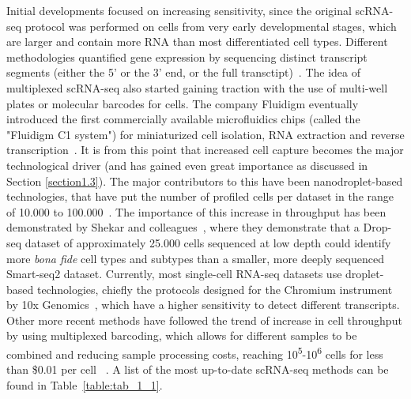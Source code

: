 Initial developments focused on increasing sensitivity, since the original scRNA-seq protocol was performed on cells from very early developmental stages, which are larger and contain more RNA than most differentiated cell types. Different methodologies quantified gene expression by sequencing distinct transcript segments (either the 5' or the 3' end, or the full transctipt)~\citep{islam_characterization_2011,hashimshony_cel-seq:_2012,ramskold_full-length_2012,picelli_full-length_2014}. The idea of multiplexed scRNA-seq also started gaining traction with the use of multi-well plates or molecular barcodes for cells. The company Fluidigm eventually introduced the first commercially available microfluidics chips (called the "Fluidigm C1 system") for miniaturized cell isolation, RNA extraction and reverse transcription~\citep{brennecke_accounting_2013}. It is from this point that increased cell capture becomes the major technological driver (and has gained even great importance as discussed in Section \ref{section1.3}). The major contributors to this have been nanodroplet-based technologies, that have put the number of profiled cells per dataset in the range of 10.000 to 100.000~\citep{macosko_highly_2015,klein_droplet_2015}. The importance of this increase in throughput has been demonstrated by Shekar and colleagues~\citep{shekhar_comprehensive_2016}, where they demonstrate that a Drop-seq dataset of approximately 25.000 cells sequenced at low depth could identify more \textit{bona fide} cell types and subtypes than a smaller, more deeply sequenced Smart-seq2 dataset. Currently, most single-cell RNA-seq datasets use droplet-based technologies, chiefly the protocols designed for the Chromium instrument by 10x Genomics~\citep{zheng_massively_2017}, which have a higher sensitivity to detect different transcripts. Other more recent methods have followed the trend of increase in cell throughput by using multiplexed barcoding, which allows for different samples to be combined and reducing sample processing costs, reaching 10\textsuperscript{5}-10\textsuperscript{6} cells for less than \$0.01 per cell ~\citep{rosenberg_single-cell_2018,cao_single-cell_2019}. A list of the most up-to-date scRNA-seq methods can be found in Table~\ref{table:tab_1_1}.

